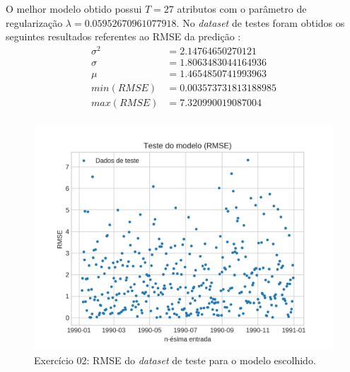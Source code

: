 \documentclass{article}
\begin{document}
    O melhor modelo obtido possui $T=27$ atributos com o parâmetro de regularização $\lambda=0.05952670961077918$.
    No \textit{dataset} de testes foram obtidos os seguintes resultados referentes ao RMSE da predição :
    \begin{align}
        \sigma^2&=2.14764650270121\\
        \sigma&=1.8063483044164936\\
        \mu&=1.4654850741993963\\
        min(RMSE)&=0.003573731813188985\\
        max(RMSE)&=7.320990019087004\\
    \end{align}
    \begin{figure}[H]
        \centering
        \includegraphics[width=\linewidth]{ex02/model_rmse.png}
        \caption{Exercício 02: RMSE do \textit{dataset} de teste para o modelo escolhido.}
        \label{fig:ex2_rmse}
    \end{figure}
\end{document}
